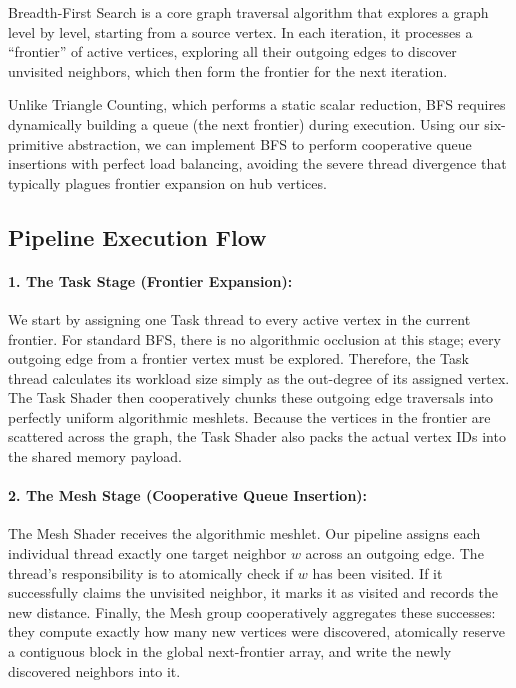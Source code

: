 \documentclass[11pt, a4paper]{article}
\begin{document}
Breadth-First Search is a core graph traversal algorithm that explores a graph level by level, starting from a source vertex. In each iteration, it processes a ``frontier'' of active vertices, exploring all their outgoing edges to discover unvisited neighbors, which then form the frontier for the next iteration. 

Unlike Triangle Counting, which performs a static scalar reduction, BFS requires dynamically building a queue (the next frontier) during execution. Using our six-primitive abstraction, we can implement BFS to perform cooperative queue insertions with perfect load balancing, avoiding the severe thread divergence that typically plagues frontier expansion on hub vertices.

\subsection{Pipeline Execution Flow}

\paragraph{1. The Task Stage (Frontier Expansion):}
We start by assigning one Task thread to every active vertex in the current frontier. For standard BFS, there is no algorithmic occlusion at this stage; every outgoing edge from a frontier vertex must be explored. Therefore, the Task thread calculates its workload size simply as the out-degree of its assigned vertex. The Task Shader then cooperatively chunks these outgoing edge traversals into perfectly uniform algorithmic meshlets. Because the vertices in the frontier are scattered across the graph, the Task Shader also packs the actual vertex IDs into the shared memory payload.

\paragraph{2. The Mesh Stage (Cooperative Queue Insertion):}
The Mesh Shader receives the algorithmic meshlet. Our pipeline assigns each individual thread exactly one target neighbor $w$ across an outgoing edge. The thread's responsibility is to atomically check if $w$ has been visited. If it successfully claims the unvisited neighbor, it marks it as visited and records the new distance. Finally, the Mesh group cooperatively aggregates these successes: they compute exactly how many new vertices were discovered, atomically reserve a contiguous block in the global next-frontier array, and write the newly discovered neighbors into it.
\end{document}
